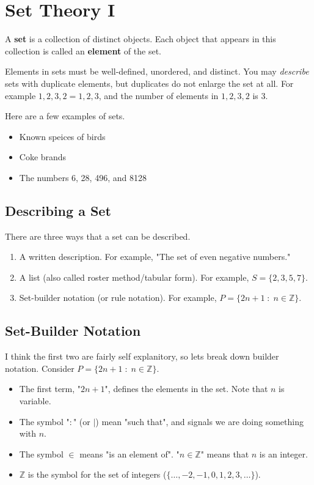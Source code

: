 \chapter{Set Theory I}

\mydefine
{
	A {\bf set} is a collection of distinct objects. Each object that appears in this collection is called an {\bf element} of the set.
}

Elements in sets must be well-defined, unordered, and distinct. You may \emph{describe} sets with duplicate elements, but duplicates do not enlarge the set at all. For example ${1,2,3,2}={1,2,3}$, and the number of elements in ${1,2,3,2}$ is 3.

\myexample
{
	Here are a few examples of sets.
	\begin{itemize}
		\item Known speices of birds
		\item Coke brands
		\item The numbers 6, 28, 496, and 8128
	\end{itemize}
}

\section{Describing a Set}

There are three ways that a set can be described.

\begin{enumerate}
	\item A written description. For example, "The set of even negative numbers."
	\item A list (also called roster method/tabular form). For example, $S = \{2,3,5,7\}$.
	\item Set-builder notation (or rule notation). For example, $P = \{2n+1\;:\;n \in \mathbb{Z}\}$.
\end{enumerate}

\section{Set-Builder Notation}

I think the first two are fairly self explanitory, so lets break down builder notation. Consider $P = \{2n+1\;:\;n \in \mathbb{Z}\}$.

\begin{itemize}
	\item The first term, "$2n+1$", defines the elements in the set. Note that $n$ is variable.
	\item The symbol "$:$" (or $|$) mean "such that", and signals we are doing something with $n$.
	\item The symbol $\in$ means "is an element of". "$n \in \mathbb{Z}$" means that $n$ is an integer.
	\item $\mathbb{Z}$ is the symbol for the set of integers ($\{\dots,-2,-1,0,1,2,3,\dots\}$).
\end{itemize}

